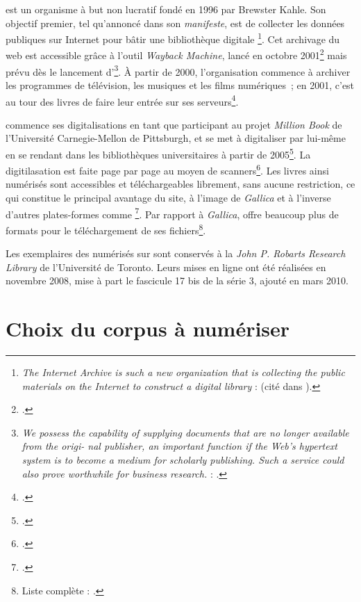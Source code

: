 \ia{} est un organisme à but non lucratif fondé en 1996 par Brewster Kahle. Son objectif premier, tel qu'annoncé dans son \textit{manifeste}, est de \og collecter les données publiques sur Internet pour bâtir une bibliothèque digitale \fg{}\footnote{\og \textit{The Internet Archive is such a new organization that is collecting the public materials on the Internet to construct a digital library} \fg{} : \cite{Brewster1} (cité dans \cite{Brewster2}).}. Cet archivage du web est accessible grâce à l'outil \textit{Wayback Machine}, lancé en octobre 2001\footcite[p.344]{panos} mais prévu dès le lancement d'\ia\footnote{\textit{We possess the capability of supplying documents that are no longer available from the origi- nal publisher, an important function if the Web’s hypertext system is to become a medium for scholarly publishing. Such a service could also prove worthwhile for business research.} : \cite[p.83]{iamanifest}.}. À partir de 2000, l'organisation commence à archiver les programmes de télévision, les musiques et les films numériques~; en 2001, c'est au tour des livres de faire leur entrée sur ses serveurs\footcite[p. 3-4]{Brewster2}.

\ia{} commence ses digitalisations en tant que participant au projet \textit{Million Book} de l'Université Carnegie-Mellon de Pittsburgh, et se met à digitaliser par lui-même en se rendant dans les bibliothèques universitaires à partir de 2005\footcite[p. 4]{Brewster2}. La digitilasation est faite page par page au moyen de scanners\footcite[p. 4]{Brewster2}. Les livres ainsi numérisés sont accessibles  et téléchargeables librement, sans aucune restriction, ce qui constitue le principal avantage du site, à l'image de \textit{Gallica} et à l'inverse d'autres plates-formes comme \gb\footcite[p. 1]{Brewster2}. Par rapport à \textit{Gallica}, \ia{} offre beaucoup plus de formats pour le téléchargement de ses fichiers\footnote{Liste complète : \cite[p. 33]{chague}.}.

Les exemplaires des \odm{} numérisés sur \ia{} sont conservés à la \textit{John P. Robarts Research Library} de l'Université de Toronto. Leurs mises en ligne ont été réalisées en novembre 2008, mise à part le fascicule 17 bis de la série 3, ajouté en mars 2010.

\section{Choix du corpus à numériser}

